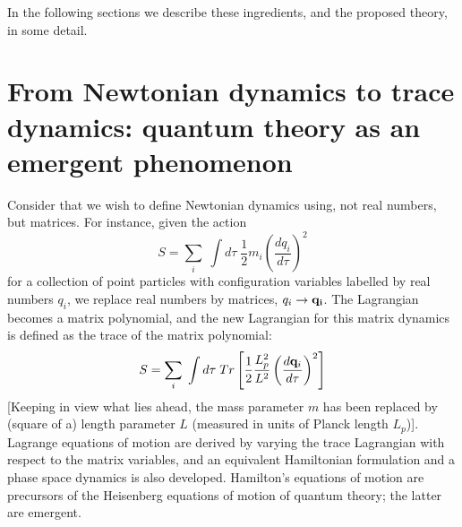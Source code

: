 \documentclass[a4paper]{jpconf}
\begin{document}
In the following sections we describe these ingredients, and the proposed theory, in some detail. 

\section{From Newtonian dynamics to trace dynamics: quantum theory as an emergent phenomenon}
Consider that we wish to define Newtonian dynamics using, not real numbers, but matrices. For instance, given the action 
\begin{equation}
S = \sum_i\;  \int d\tau \; \frac{1}{2}m_i\left(\frac{dq_i}{d\tau}\right)^2
\end{equation}
for a collection of point particles with configuration variables labelled by real numbers $q_i$, we replace real numbers by matrices, $q_i \rightarrow {\bf q_i}$. The Lagrangian becomes a matrix polynomial, and the new Lagrangian for this matrix dynamics is defined as the trace of the matrix polynomial:
\begin{equation}
S = \sum_i\;  \int d\tau \; Tr\left[ \frac{1}{2}\frac{L_{p}^2}{L^2}\left(\frac{d{\bf q}_i}{d\tau}\right)^2 \right]
\end{equation}
[Keeping in view what lies ahead, the mass parameter $m$ has been replaced by (square of a) length parameter $L$ (measured in units of Planck length $L_p$)]. Lagrange equations of motion are derived by varying the trace Lagrangian with respect to the matrix variables, and an equivalent Hamiltonian formulation and a phase space dynamics is also developed. Hamilton's equations of motion are precursors of the Heisenberg equations of motion of quantum theory; the latter are emergent.
\end{document}
